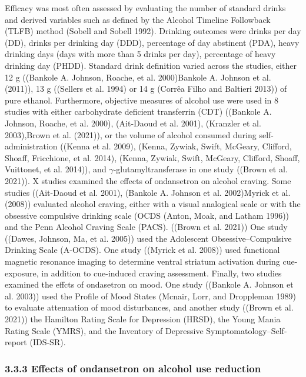 \documentclass[
  12pt,
]{article}
\begin{document}
Efficacy was most often assessed by evaluating the number of standard
drinks and derived variables such as defined by the Alcohol Timeline
Followback (TLFB) method (Sobell and Sobell 1992). Drinking outcomes
were drinks per day (DD), drinks per drinking day (DDD), percentage of
day abstinent (PDA), heavy drinking days (days with more than 5 drinks
per day), percentage of heavy drinking day (PHDD). Standard drink
definition varied across the studies, either 12 g ((Bankole A. Johnson,
Roache, et al. 2000)Bankole A. Johnson et al. (2011)), 13 g ((Sellers et
al. 1994) or 14 g (Corrêa Filho and Baltieri 2013)) of pure ethanol.
Furthermore, objective measures of alcohol use were used in 8 studies
with either carbohydrate deficient transferrin (CDT) ((Bankole A.
Johnson, Roache, et al. 2000), (Ait‐Daoud et al. 2001), (Kranzler et al.
2003),Brown et al. (2021)), or the volume of alcohol consumed during
self-administration ((Kenna et al. 2009), (Kenna, Zywiak, Swift,
McGeary, Clifford, Shoaff, Fricchione, et al. 2014), (Kenna, Zywiak,
Swift, McGeary, Clifford, Shoaff, Vuittonet, et al. 2014)), and
\(\gamma\)-glutamyltransferase in one study ((Brown et al. 2021)). X
studies examined the effects of ondansetron on alcohol craving. Some
studies ((Ait-Daoud et al. 2001), (Bankole A. Johnson et al. 2002)Myrick
et al. (2008)) evaluated alcohol craving, either with a visual
analogical scale or with the obsessive compulsive drinking scale (OCDS
(Anton, Moak, and Latham 1996)) and the Penn Alcohol Craving Scale
(PACS). ((Brown et al. 2021)) One study ((Dawes, Johnson, Ma, et al.
2005)) used the Adolescent Obsessive--Compulsive Drinking Scale
(A-OCDS). One study ((Myrick et al. 2008)) used functional magnetic
resonance imaging to determine ventral striatum activation during
cue-exposure, in addition to cue-induced craving assessment. Finally,
two studies examined the effcts of ondasetron on mood. One study
((Bankole A. Johnson et al. 2003)) used the Profile of Mood States
(Mcnair, Lorr, and Droppleman 1989) to evaluate attenuation of mood
disturbances, and another study ((Brown et al. 2021)) the Hamilton
Rating Scale for Depression (HRSD), the Young Mania Rating Scale (YMRS),
and the Inventory of Depressive Symptomatology--Self-report (IDS-SR).

\subsubsection{3.3.3 Effects of ondansetron on alcohol use
reduction}\label{effects-of-ondansetron-on-alcohol-use-reduction}
\end{document}

